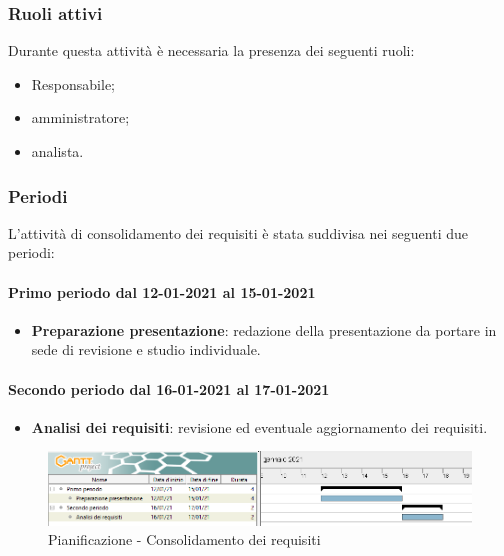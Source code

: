 \subsubsection{Ruoli attivi}
Durante questa attività è necessaria la presenza dei seguenti ruoli:
\begin{itemize}
	\item Responsabile;
	\item amministratore;
	\item analista.
\end{itemize}

\subsubsection{Periodi}
L'attività di consolidamento dei requisiti è stata suddivisa nei seguenti due periodi:

\paragraph{Primo periodo dal 12-01-2021 al 15-01-2021}
\begin{itemize}

	\item \textbf{Preparazione presentazione}: redazione della presentazione da portare in sede di revisione e studio individuale.

\end{itemize}

\paragraph{Secondo periodo dal 16-01-2021 al 17-01-2021}
\begin{itemize}

	\item \textbf{Analisi dei requisiti}: revisione ed eventuale aggiornamento dei requisiti.

\end{itemize}

\newpage

\begin{landscape}
	\begin{figure}[h!]
		\includegraphics[width=24cm]{images/2_Consolidamento_dei_requisiti.png}
		\caption{Pianificazione - Consolidamento dei requisiti}
	\end{figure}
\end{landscape}

